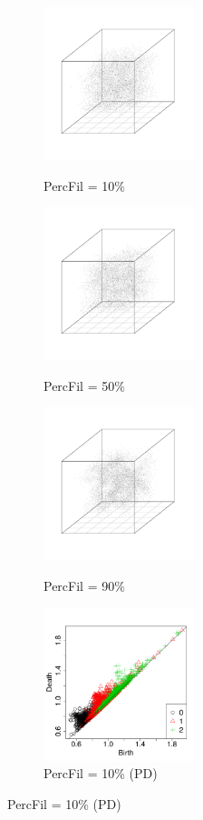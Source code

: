 \documentclass[12pt]{article}
\begin{document}
\begin{center}
  \begin{figure}[htp!]
    \centering
    \begin{subfigure}{.32\textwidth}
      \centering
      \caption{PercFil = 10\%}
      \includegraphics[height=1.75in]{figure_7_plot_pf_0_1.pdf}
      \label{fig:percfil01voronoi}
    \end{subfigure}
      \begin{subfigure}{.32\textwidth}
      \centering
      \caption{PercFil = 50\%}
      \includegraphics[height=1.75in]{figure_7_plot_pf_0_5.pdf}
      \label{fig:percfil09voronoi}
    \end{subfigure}
      \begin{subfigure}{.32\textwidth}
      \centering
      \caption{PercFil = 90\%}
      \includegraphics[height=1.75in]{figure_7_plot_pf_0_9.pdf}
      \label{fig:percfil09voronoi}
    \end{subfigure}
      \begin{subfigure}{.32\textwidth}
      \centering
      \caption{PercFil = 10\% (PD)}
      \includegraphics[height=1.75in]{figure_7_pd_0_1.pdf}

\end{subfigure}
\end{figure}
\end{center}
\end{document}
